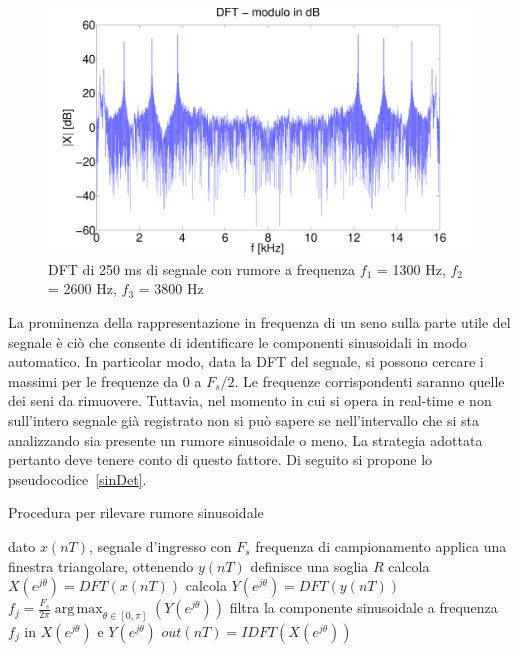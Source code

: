 \documentclass[10pt,A4]{article}
\DeclareMathOperator*{\argmax}{arg\,max}
\begin{document}
\begin{figure}[h]
  \centering
  \includegraphics[width = 1\textwidth, keepaspectratio]{images/DFTdB.pdf}
  \caption{DFT di 250 ms di segnale con rumore a frequenza $f_1$ = 1300 Hz, $f_2$ = 2600 Hz, $f_3$ = 3800 Hz}
  \label{fig:unfilt}
\end{figure}

La prominenza della rappresentazione in frequenza di un seno sulla parte utile del segnale è ciò che consente di identificare le componenti sinusoidali in modo automatico. In particolar modo, data la DFT del segnale, si possono cercare i massimi per le frequenze da 0 a $F_s/2$. Le frequenze corrispondenti saranno quelle dei seni da rimuovere. Tuttavia, nel momento in cui si opera in real-time e non sull'intero segnale già registrato non si può sapere se nell'intervallo che si sta analizzando sia presente un rumore sinusoidale o meno. La strategia adottata pertanto deve tenere conto di questo fattore. Di seguito si propone lo pseudocodice~\ref{sinDet}. \\

\begin{algorithm}
  \caption{Procedura per rilevare rumore sinusoidale}\label{sinDet}
  \begin{algorithmic}[1]
    \Procedure{}{}
    \State dato $x(nT)$, segnale d'ingresso con
    \State $F_s$ frequenza di campionamento
    \State applica una finestra triangolare, ottenendo $y(nT)$
    \State definisce una soglia $R$
    \State calcola $X(e^{j\theta}) = DFT(x(nT))$
    \State calcola $Y(e^{j\theta}) = DFT(y(nT))$
    \State $f_j = \frac{F_s}{2\pi} \argmax_{\theta \in [0, \pi]}(Y(e^{j\theta}))$
    \State filtra la componente sinusoidale a frequenza $f_j$ in $X(e^{j\theta})$ e $Y(e^{j\theta})$
    \EndWhile
    \State $out(nT) = IDFT(X(e^{j\theta}))$
    \EndProcedure
  \end{algorithmic}
\end{algorithm}
\end{document}
